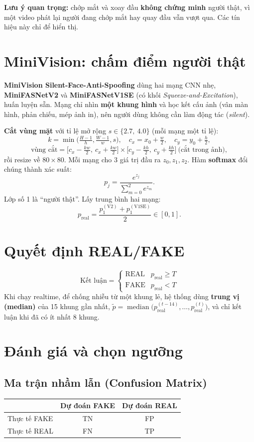\documentclass[12pt,a4paper]{article}
\begin{document}
\textbf{Lưu ý quan trọng:} chớp mắt và xoay đầu \textbf{không chứng minh} người thật, vì một video phát lại người đang chớp mắt hay quay đầu vẫn vượt qua. Các tín hiệu này chỉ để hiển thị.

\section{MiniVision: chấm điểm người thật}
\textbf{MiniVision Silent-Face-Anti-Spoofing} dùng hai mạng CNN nhẹ, \textbf{MiniFASNetV2} và \textbf{MiniFASNetV1SE} (có khối \emph{Squeeze-and-Excitation}), huấn luyện sẵn. Mạng chỉ nhìn \textbf{một khung hình} và học kết cấu ảnh (vân màn hình, phản chiếu, mép ảnh in), nên người dùng không cần làm động tác (\emph{silent}).

\textbf{Cắt vùng mặt} với tỉ lệ mở rộng $s \in \{2.7,\ 4.0\}$ (mỗi mạng một tỉ lệ):
\[
k = \min\!\Big(\tfrac{H-1}{h}, \tfrac{W-1}{w}, s\Big),\quad
c_x = x_0 + \tfrac{w}{2},\quad c_y = y_0 + \tfrac{h}{2},
\]
\[
\text{vùng cắt} = \big[c_x - \tfrac{kw}{2},\ c_x + \tfrac{kw}{2}\big] \times \big[c_y - \tfrac{kh}{2},\ c_y + \tfrac{kh}{2}\big]\ \text{(cắt trong ảnh)},
\]
rồi resize về $80\times80$. Mỗi mạng cho 3 giá trị đầu ra $z_0, z_1, z_2$. Hàm \textbf{softmax} đổi chúng thành xác suất:
\[
p_j = \frac{e^{z_j}}{\sum_{m=0}^{2} e^{z_m}} .
\]
Lớp số 1 là ``người thật''. Lấy trung bình hai mạng:
\[
p_{\text{real}} = \frac{p_1^{(\text{V2})} + p_1^{(\text{V1SE})}}{2} \in [0,1].
\]

\section{Quyết định REAL/FAKE}
\[
\text{Kết luận} =
\begin{cases}
\text{REAL} & p_{\text{real}} \ge T\\
\text{FAKE} & p_{\text{real}} < T
\end{cases}
\]
Khi chạy realtime, để chống nhiễu từ một khung lẻ, hệ thống dùng \textbf{trung vị (median)} của 15 khung gần nhất,
$\tilde p = \operatorname{median}\big(p_{\text{real}}^{(t-14)}, \dots, p_{\text{real}}^{(t)}\big)$,
và chỉ kết luận khi đã có ít nhất 8 khung.

\section{Đánh giá và chọn ngưỡng}
\subsection{Ma trận nhầm lẫn (Confusion Matrix)}
\begin{center}
\begin{tabular}{lcc}
\toprule
 & Dự đoán FAKE & Dự đoán REAL \\
\midrule
Thực tế FAKE & TN & FP \\
Thực tế REAL & FN & TP \\
\bottomrule
\end{tabular}
\end{center}
\end{document}
